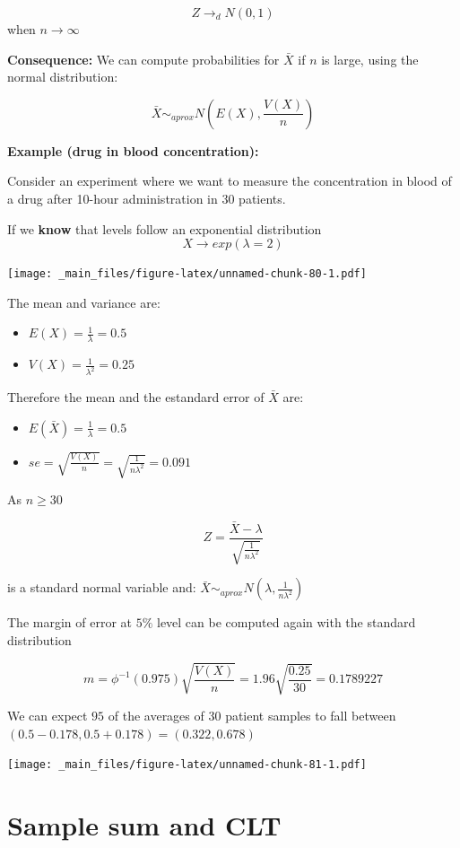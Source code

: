 \documentclass[
]{book}
\providecommand{\tightlist}{%
  \setlength{\itemsep}{0pt}\setlength{\parskip}{0pt}}
\begin{document}
\[Z \rightarrow_d N(0,1)\] when \(n\rightarrow \infty\)

\textbf{Consequence:} We can compute probabilities for \(\bar{X}\) if \(n\) is large, using the normal distribution:

\[\bar{X} \sim_{aprox}  N(E(X), \frac{V(X)}{n})\]

\textbf{Example (drug in blood concentration):}

Consider an experiment where we want to measure the concentration in blood of a drug after 10-hour administration in \(30\) patients.

If we \textbf{know} that levels follow an exponential distribution \[X \rightarrow exp(\lambda=2)\]

\texttt{[image: \_main\_files/figure-latex/unnamed-chunk-80-1.pdf]}

The mean and variance are:

\begin{itemize}
\tightlist
\item
  \(E(X)=\frac{1}{\lambda}=0.5\)
\item
  \(V(X)=\frac{1}{\lambda^2}=0.25\)
\end{itemize}

Therefore the mean and the estandard error of \(\bar{X}\) are:

\begin{itemize}
\tightlist
\item
  \(E(\bar{X})=\frac{1}{\lambda}=0.5\)
\item
  \(se=\sqrt{\frac{V(X)}{n}}=\sqrt{\frac{1}{n\lambda^2}}=0.091\)
\end{itemize}

As \(n \geq 30\)

\[Z=\frac{\bar{X}-\lambda}{\sqrt{\frac{1}{n\lambda^2}}}\]

is a standard normal variable and: \(\bar{X} \sim_{aprox} N(\lambda, \frac{1}{n\lambda^2})\)

The margin of error at \(5\%\) level can be computed again with the standard distribution

\[m=\phi^{-1}(0.975) \sqrt{\frac{V(X)}{n}}=1.96\sqrt{\frac{0.25}{30}}=0.1789227\]

We can expect \(95%
\) of the averages of \(30\) patient samples to fall between
\((0.5-0.178, 0.5+0.178)= (0.322, 0.678)\)

\texttt{[image: \_main\_files/figure-latex/unnamed-chunk-81-1.pdf]}

\hypertarget{sample-sum-and-clt}{%
\section{Sample sum and CLT}\label{sample-sum-and-clt}}
\end{document}
